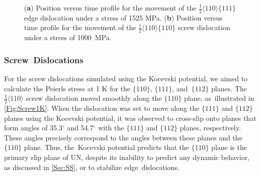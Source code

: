 \documentclass[applsci,article,accept,pdftex,moreauthors]{Definitions/mdpi}
\newcommand{\?}{\stackrel{?}{=}}
\begin{document}
\begin{figure}[H]
{\captionsetup{position=bottom,justification=centering}
\hfill
{}
}

\caption{(\textbf{a}) Position versus time profile for the movement of the $\frac{1}{2} \langle 110 \rangle \{ 111 \}$ edge dislocation under a stress of 1525 MPa. (\textbf{b}) Position versus time profile for the movement of the $\frac{1}{2} \langle 110 \rangle \{ 110 \}$ screw dislocation under a stress of 1000~MPa.}
\label{Fig:6}
\end{figure}

\subsubsection{Screw~Dislocations}

For the screw dislocations simulated using the Kocevski potential, we aimed to calculate the Peierls stress at 1 K for the $\{110\}$, $\{111\}$, and~$\{112\}$ planes. The~$\frac{1}{2} \langle 110 \rangle$ screw dislocation moved smoothly along the $\{110\}$ plane, as~illustrated in \cref{Fig:Screw1K}. When the dislocation was set to move along the $\{111\}$ and $\{112\}$ planes using the Kocevski potential, it was observed to cross-slip onto planes that form angles of 35.3$^\circ$ and 54.7$^\circ$ with the $\{111\}$ and $\{112\}$ planes, respectively. These angles precisely correspond to the angles between these planes and the $\{110\}$ plane. Thus, the~Kocevski potential predicts that the $\{110\}$ plane is the primary slip plane of UN, despite its inability to predict any dynamic behavior, as discussed in \cref{Sec:SS}, or to stabilize edge~dislocations.
\end{document}
